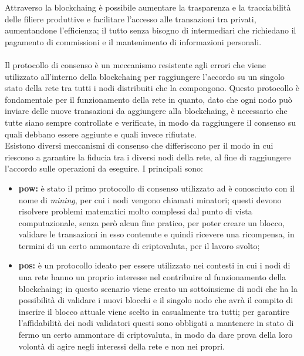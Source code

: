 Attraverso la \gls{blockchaing} è possibile aumentare la trasparenza e la tracciabilità delle filiere produttive e facilitare l'accesso alle transazioni tra privati, aumentandone l'efficienza; il tutto senza bisogno di intermediari che richiedano il pagamento di commissioni e il mantenimento di informazioni personali.
\\\\
Il protocollo di consenso è un meccanismo resistente agli errori che viene utilizzato all'interno della \gls{blockchaing} per raggiungere l'accordo su un singolo stato della rete tra tutti i nodi distribuiti che la compongono. Questo protocollo è fondamentale per il funzionamento della rete in quanto, dato che ogni nodo può inviare delle nuove transazioni da aggiungere alla \gls{blockchaing}, è necessario che tutte siano sempre controllate e verificate, in modo da raggiungere il consenso su quali debbano essere aggiunte e quali invece rifiutate.\\
Esistono diversi meccanismi di consenso che differiscono per il modo in cui riescono a garantire la fiducia tra i diversi nodi della rete, al fine di raggiungere l'accordo sulle operazioni da eseguire. I principali sono:

\begin{itemize}
	\item \textbf{\gls{pow}:} è stato il primo protocollo di consenso utilizzato ad è conosciuto con il nome di \textit{mining}, per cui i nodi vengono chiamati minatori; questi devono risolvere problemi matematici molto complessi dal punto di vista computazionale, senza però alcun fine pratico, per poter creare un blocco, validare le transazioni in esso contenute e quindi ricevere una ricompensa, in termini di un certo ammontare di criptovaluta, per il lavoro svolto;
	\item \textbf{\gls{pos}:} è un protocollo ideato per essere utilizzato nei contesti in cui i nodi di una rete hanno un proprio interesse nel contribuire al funzionamento della \gls{blockchaing}; in questo scenario viene creato un sottoinsieme di nodi che ha la possibilità di validare i nuovi blocchi e il singolo nodo che avrà il compito di inserire il blocco attuale viene scelto in casualmente tra tutti; per garantire l'affidabilità dei nodi validatori questi sono obbligati a mantenere in stato di fermo un certo ammontare di criptovaluta, in modo da dare prova della loro volontà di agire negli interessi della rete e non nei propri.
\end{itemize}

